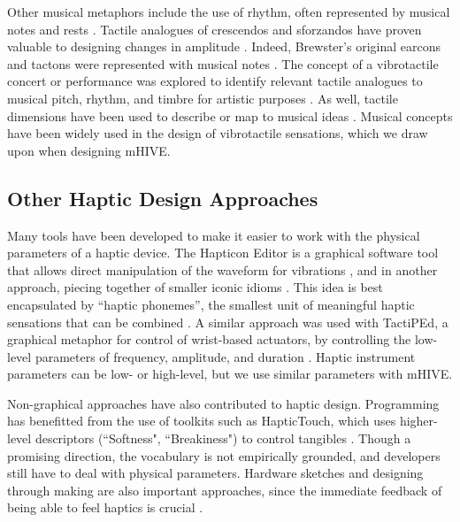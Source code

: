 Other musical metaphors include the use of rhythm, often represented by musical notes and rests \cite{Ternes2008,Brown2005,Chan2008, Brown2006a}.
Tactile analogues of crescendos and sforzandos have proven valuable to designing changes in amplitude \cite{Brown2006}.
Indeed, Brewster's original earcons and tactons were represented with musical notes \cite{Brewster1993,Brewster2004}.
The concept of a vibrotactile concert or performance was explored to identify relevant tactile analogues to musical pitch, rhythm, and timbre for artistic purposes \cite{Gunther2002}.
As well, tactile dimensions have been used to describe or map to musical ideas \cite{Eitan2010}.
Musical concepts have been widely used in the design of vibrotactile sensations, which we draw upon when designing mHIVE.

\subsection{Other  Haptic Design Approaches}
Many tools have been developed to make it easier to work with the physical parameters of a haptic device.
The Hapticon Editor is a graphical software tool that allows direct manipulation of the waveform for vibrations \cite{Enriquez2003}, and in another approach, piecing together of smaller iconic idioms \cite{Swindells2006}.
This idea is best encapsulated by ``haptic phonemes'', the smallest unit of meaningful haptic sensations that can be combined \cite{Enriquez2006}.
A similar approach was used with TactiPEd, a graphical metaphor for control of wrist-based actuators, by controlling the low-level parameters of frequency, amplitude, and duration \cite{Paneels2013}.
Haptic instrument parameters can be low- or high-level, but we use similar parameters with mHIVE.


Non-graphical approaches have also contributed to haptic design.
Programming has benefitted from the use of toolkits such as HapticTouch, which uses higher-level descriptors (``Softness", ``Breakiness") to control tangibles \cite{Ledo2012}.
Though a promising direction, the vocabulary is not empirically grounded, and developers still have to deal with physical parameters.
Hardware sketches and designing through making are also important approaches, since the immediate feedback of being able to feel haptics is crucial \cite{Moussette2011}.

